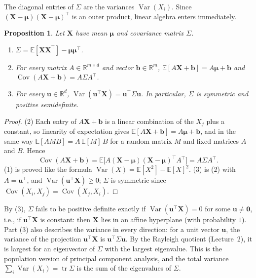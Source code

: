 \documentclass[11pt]{article}
\newcommand{\E}{\mathbb{E}}
\DeclareMathOperator{\Var}{Var}
\DeclareMathOperator{\Cov}{Cov}
\theoremstyle{definition}
\theoremstyle{plain}
\newtheorem{proposition}[definition]{Proposition}
\theoremstyle{remark}
\DeclareMathOperator{\tr}{tr}
\begin{document}
The diagonal entries of $\Sigma$ are the variances $\Var(X_i)$. Since $(\mathbf{X} - \boldsymbol{\mu})(\mathbf{X} - \boldsymbol{\mu})^\top$ is an outer product, linear algebra enters immediately.

\begin{proposition}\label{prop:covariance-matrix}
    Let $\mathbf{X}$ have mean $\boldsymbol{\mu}$ and covariance matrix $\Sigma$.
    \begin{enumerate}
        \item $\Sigma = \E[\mathbf{X}\mathbf{X}^\top] - \boldsymbol{\mu}\boldsymbol{\mu}^\top$.
        \item For every matrix $A \in \mathbb{R}^{m \times d}$ and vector $\mathbf{b} \in \mathbb{R}^m$, $\E[A\mathbf{X} + \mathbf{b}] = A\boldsymbol{\mu} + \mathbf{b}$ and $\Cov(A\mathbf{X} + \mathbf{b}) = A\Sigma A^\top$.
        \item For every $\mathbf{u} \in \mathbb{R}^d$, $\Var(\mathbf{u}^\top\mathbf{X}) = \mathbf{u}^\top\Sigma\mathbf{u}$. In particular, $\Sigma$ is symmetric and positive semidefinite.
    \end{enumerate}
\end{proposition}

\begin{proof}
    (2) Each entry of $A\mathbf{X} + \mathbf{b}$ is a linear combination of the $X_j$ plus a constant, so linearity of expectation gives $\E[A\mathbf{X} + \mathbf{b}] = A\boldsymbol{\mu} + \mathbf{b}$, and in the same way $\E[A M B] = A\,\E[M]\,B$ for a random matrix $M$ and fixed matrices $A$ and $B$. Hence
    \[\Cov(A\mathbf{X} + \mathbf{b}) = \E\big[A(\mathbf{X} - \boldsymbol{\mu})(\mathbf{X} - \boldsymbol{\mu})^\top A^\top\big] = A\Sigma A^\top.\]
    (1) is proved like the formula $\Var(X) = \E[X^2] - \E[X]^2$. (3) is (2) with $A = \mathbf{u}^\top$, and $\Var(\mathbf{u}^\top\mathbf{X}) \geq 0$; $\Sigma$ is symmetric since $\Cov(X_i, X_j) = \Cov(X_j, X_i)$.
\end{proof}

By (3), $\Sigma$ fails to be positive definite exactly if $\Var(\mathbf{u}^\top\mathbf{X}) = 0$ for some $\mathbf{u} \neq \mathbf{0}$, i.e., if $\mathbf{u}^\top\mathbf{X}$ is constant: then $\mathbf{X}$ lies in an affine hyperplane (with probability $1$). Part (3) also describes the variance in every direction: for a unit vector $\mathbf{u}$, the variance of the projection $\mathbf{u}^\top\mathbf{X}$ is $\mathbf{u}^\top\Sigma\mathbf{u}$. By the Rayleigh quotient (Lecture~2), it is largest for an eigenvector of $\Sigma$ with the largest eigenvalue. This is the population version of principal component analysis, and the total variance $\sum_i \Var(X_i) = \tr\Sigma$ is the sum of the eigenvalues of $\Sigma$.
\end{document}
